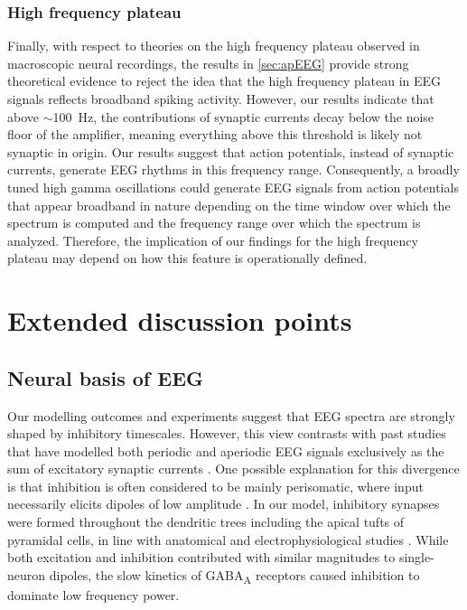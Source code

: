 \subsubsection{High frequency plateau}
Finally, with respect to theories on the high frequency plateau observed in macroscopic neural recordings, the results in \autoref{sec:apEEG} provide strong theoretical evidence to reject the idea that the high frequency plateau in EEG signals reflects broadband spiking activity. However, our results indicate that above $\sim$\qty{100}{\hertz}, the contributions of synaptic currents decay below the noise floor of the amplifier, meaning everything above this threshold is likely not synaptic in origin. Our results suggest that action potentials, instead of synaptic currents, generate EEG rhythms in this frequency range. Consequently, a broadly tuned high gamma oscillations could generate EEG signals from action potentials that appear broadband in nature depending on the time window over which the spectrum is computed and the frequency range over which the spectrum is analyzed. Therefore, the implication of our findings for the high frequency plateau may depend on how this feature is operationally defined.

\section{Extended discussion points}

\subsection{Neural basis of EEG}
Our modelling outcomes and experiments suggest that EEG spectra are strongly shaped by inhibitory timescales. However, this view contrasts with past studies that have modelled both periodic and aperiodic EEG signals exclusively as the sum of excitatory synaptic currents \cite{Miller2007,Jensen2005,McCarthy2008,Ching2010}. One possible explanation for this divergence is that inhibition is often considered to be mainly perisomatic, where input necessarily elicits dipoles of low amplitude \cite{Nunez2006,Næss2021,Ahlfors2015}. In our model, inhibitory synapses were formed throughout the dendritic trees including the apical tufts of pyramidal cells, in line with anatomical and electrophysiological studies \cite{Palmer2012, Karimi2020, Iacaruso2017}. While both excitation and inhibition contributed with similar magnitudes to single-neuron dipoles, the slow kinetics of GABA\textsubscript{A} receptors caused inhibition to dominate low frequency power.

